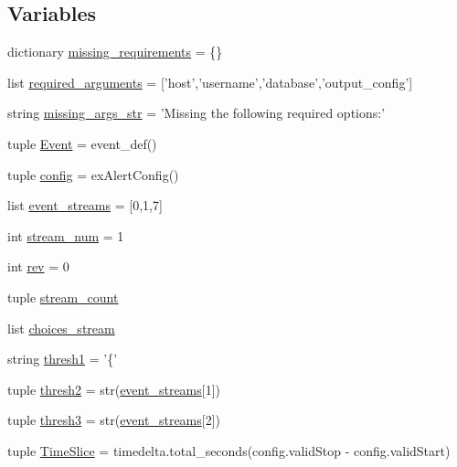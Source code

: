 \subsection*{Variables}
\begin{DoxyCompactItemize}
\item 
dictionary \hyperlink{namespacerun__archival_a4e34d883a21aad086411da12b9df04af}{missing\-\_\-requirements} = \{\}
\item 
list \hyperlink{namespacerun__archival_a4f433eaf745d43b1793399014f83b4d4}{required\-\_\-arguments} = \mbox{[}'host','username','database','output\-\_\-config'\mbox{]}
\item 
string \hyperlink{namespacerun__archival_a5770f98d6d8edce5553721e9cb3873fd}{missing\-\_\-args\-\_\-str} = 'Missing the following required options\-:'
\item 
tuple \hyperlink{namespacerun__archival_a81b9709cc3c8589bfc7ecd72c354cba6}{Event} = event\-\_\-def()
\item 
tuple \hyperlink{namespacerun__archival_abe42e5e247442fb2afd7c8aa5322cd5f}{config} = ex\-Alert\-Config()
\item 
list \hyperlink{namespacerun__archival_a175f39c7d10885511c4623d3425db6ba}{event\-\_\-streams} = \mbox{[}0,1,7\mbox{]}
\item 
int \hyperlink{namespacerun__archival_a5a97b1e71d6ad7513865ee536b7b4dea}{stream\-\_\-num} = 1
\item 
int \hyperlink{namespacerun__archival_a0fe00f8ef6c40a90a1d41ecea3f75e7b}{rev} = 0
\item 
tuple \hyperlink{namespacerun__archival_a1aa2ba0984af9e6525f66fb7d1f912d5}{stream\-\_\-count}
\item 
list \hyperlink{namespacerun__archival_a18e24cc5c90db59c1cff4c0f69f82fa6}{choices\-\_\-stream}
\item 
string \hyperlink{namespacerun__archival_a345979c5efe939df4bbf314d62511433}{thresh1} = '\{'
\item 
tuple \hyperlink{namespacerun__archival_aa0af2b82ec84c97c5e9a4cffcec972c3}{thresh2} = str(\hyperlink{namespacerun__archival_a175f39c7d10885511c4623d3425db6ba}{event\-\_\-streams}\mbox{[}1\mbox{]})
\item 
tuple \hyperlink{namespacerun__archival_a59a2df7dced0835b40b789af0ee70d18}{thresh3} = str(\hyperlink{namespacerun__archival_a175f39c7d10885511c4623d3425db6ba}{event\-\_\-streams}\mbox{[}2\mbox{]})
\item 
tuple \hyperlink{namespacerun__archival_ad807127baa562a1a1f13c1c41dc9ff7c}{Time\-Slice} = timedelta.\-total\-\_\-seconds(config.\-valid\-Stop -\/ config.\-valid\-Start)

\end{DoxyCompactItemize}
